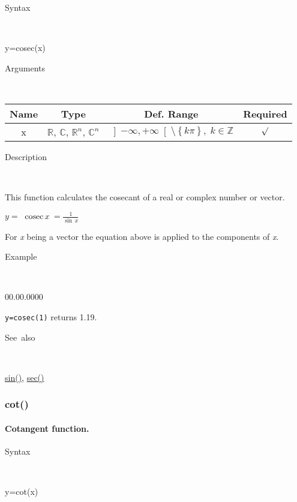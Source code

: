 \begin{description}
\item [Syntax]~
\end{description}
y=cosec(x)

\begin{description}
\item [Arguments]~
\end{description}
\begin{tabular}{|c|c|c|c|}
\hline 
Name&
Type&
Def. Range&
Required\tabularnewline
\hline
\hline 
x&
$\mathbb{R}$, $\mathbb{C}$, $\mathbb{R}^{n}$, $\mathbb{C}^{n}$&
$\left]-\infty,+\infty\right[\setminus\left\{ k\pi\right\} ,\; k\in\mathbb{Z}$&
$\surd$\tabularnewline
\hline
\end{tabular}

\begin{description}
\item [Description]~
\end{description}
This function calculates the cosecant of a real or complex number
or vector.

\medskip{}
$y=$$\textrm{\, cosec}\, x\,$$={\displaystyle \frac{1}{\sin\, x}}$
\medskip{}

For \textit{x} being a vector the equation above is applied
to the components of \textit{x}.

\begin{description}
\item [Example]~
\end{description}
\begin{lyxlist}{00.00.0000}
\item [\texttt{y=cosec(1)}]returns 1.19.
\end{lyxlist}
\begin{description}
\item [See~also]~
\end{description}
\textcolor{blue}{\hyperlink{sin}{sin()}}\textcolor{black}{,} \textcolor{blue}{\hyperlink{sec}{sec()}}


\newpage
\subsubsection*{\hypertarget{cot}{}{\Large cot()}}


\paragraph{\label{par:Cotangent}Cotangent function.}

\begin{description}
\item [Syntax]~
\end{description}
y=cot(x)

